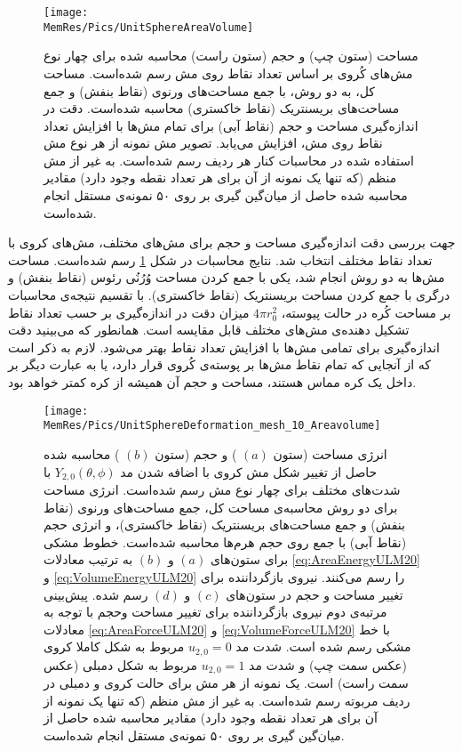 \begin{figure}[th]
\begin{center}
\texttt{[image: \\MemRes/Pics/UnitSphereAreaVolume]}
\caption{
مساحت (ستون چپ) و حجم (ستون راست) محاسبه‌ شده برای چهار نوع مش‌های کُروی بر اساس تعداد نقاط روی مش رسم شده‌است. مساحت کل، به دو روش، با جمع مساحت‌های ورنوی (نقاط بنفش) و جمع مساحت‌های بریسنتریک (نقاط خاکستری) محاسبه شده‌است. دقت در اندازه‌گیری مساحت و حجم (نقاط آبی) برای تمام مش‌ها با افزایش تعداد نقاط روی مش، افزایش می‌یابد. تصویر مش نمونه از هر نوع مش استفاده شده در محاسبات کنار هر ردیف رسم شده‌است. به غیر از مش منظم (که تنها یک نمونه از آن برای هر تعداد نقطه وجود دارد) مقادیر محاسبه شده حاصل از میان‌گین گیری بر روی ۵۰ نمونه‌ی مستقل انجام شده‌است.
}
\label{fig:unitsphereAreaVolume}
\end{center}
\end{figure}
جهت بررسی دقت اندازه‌گیری مساحت و حجم برای مش‌های مختلف، مش‌های کروی با تعداد نقاط مختلف انتخاب شد. نتایج محاسبات در شکل
\ref{fig:unitsphereAreaVolume}
رسم شده‌است. مساحت مش‌ها به دو روش انجام شد، یکی با جمع کردن مساحت‌ وُرُنُی رئوس (نقاط بنفش) و درگری با جمع کردن مساحت بریسنتریک (نقاط خاکستری). با تقسیم نتیجه‌ی محاسبات بر مساحت کُره در حالت پیوسته،
$4\pi r_0^2$
میزان دقت در اندازه‌گیری بر حسب تعداد نقاط تشکیل دهنده‌ی مش‌های مختلف قابل مقایسه است. همانطور که می‌بینید دقت اندازه‌گیری برای تمامی مش‌ها با افزایش تعداد نقاط بهتر می‌شود. لازم به ذکر است که از آنجایی که تمام نقاط مش‌ها بر پوسته‌ی کُروی قرار دارد، یا به عبارت دیگر بر داخل یک کره‌ مماس هستند، مساحت و حجم آن همیشه از کره کمتر خواهد بود.

\begin{figure}[th]
\begin{center}
\texttt{[image: \\MemRes/Pics/UnitSphereDeformation\_mesh\_10\_Areavolume]}
\caption{
انرژی مساحت (ستون 
$(a)$
) و حجم (ستون 
$(b)$
) محاسبه‌ شده حاصل از تغییر شکل مش کروی با اضافه شدن مد
$Y_{2,0}(\theta,\phi)$
با شدت‌های مختلف برای چهار نوع مش رسم شده‌است. انرژی مساحت برای دو روش محاسبه‌ی مساحت کل، جمع مساحت‌های ورنوی (نقاط بنفش) و جمع مساحت‌های بریسنتریک (نقاط خاکستری)، و انرژی حجم (نقاط آبی) با جمع روی حجم هرم‌ها محاسبه شده‌است. خطوط مشکی برای ستون‌های 
$(a)$
و
$(b)$
به ترتیب معادلات
\ref{eq:AreaEnergyULM20}
و
\ref{eq:VolumeEnergyULM20}
را رسم می‌کنند. نیروی بازگرداننده برای تغییر مساحت و حجم در ستون‌های 
$(c)$
و
$(d)$
رسم شده.  پیش‌بینی‌ مرتبه‌ی دوم نیروی بازگرداننده برای تغییر مساحت وحجم با توجه به معادلات
\ref{eq:AreaForceULM20}
و
\ref{eq:VolumeForceULM20}
با خط مشکی رسم شده است. شدت مد 
$u_{2,0}=0$
مربوط به شکل کاملا کروی (عکس سمت چپ) و شدت مد 
$u_{2,0}=1$
مربوط به شکل دمبلی (عکس سمت راست) است. یک نمونه از هر مش برای حالت کروی و دمبلی در ردیف مربوته رسم شده‌است. به غیر از مش منظم (که تنها یک نمونه از آن برای هر تعداد نقطه وجود دارد) مقادیر محاسبه شده حاصل از میان‌گین گیری بر روی ۵۰ نمونه‌ی مستقل انجام شده‌است.
}
\label{fig:unitsphereAreaVolumeULM20}
\end{center}
\end{figure}


